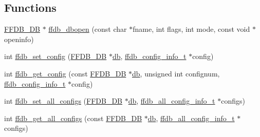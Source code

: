 \subsection*{Functions}
\begin{DoxyCompactItemize}
\item 
\mbox{\hyperlink{adat-devel_2other__libs_2filedb_2filehash_2ffdb__db_8h_a0b27b956926453a7a8141ea8e10f0df8}{F\+F\+D\+B\+\_\+\+DB}} $\ast$ \mbox{\hyperlink{adat-devel_2other__libs_2filedb_2filehash_2ffdb__db_8h_a956b24369a3231de1bee8bc33cae46e0}{ffdb\+\_\+dbopen}} (const char $\ast$fname, int flags, int mode, const void $\ast$openinfo)
\item 
int \mbox{\hyperlink{adat-devel_2other__libs_2filedb_2filehash_2ffdb__db_8h_ae36e14bba7052f0de66a7b5d1308f9ba}{ffdb\+\_\+set\+\_\+config}} (\mbox{\hyperlink{adat-devel_2other__libs_2filedb_2filehash_2ffdb__db_8h_a0b27b956926453a7a8141ea8e10f0df8}{F\+F\+D\+B\+\_\+\+DB}} $\ast$\mbox{\hyperlink{structdb}{db}}, \mbox{\hyperlink{adat-devel_2other__libs_2filedb_2filehash_2ffdb__db_8h_acc961fbd2faf6a849a1620309100fda1}{ffdb\+\_\+config\+\_\+info\+\_\+t}} $\ast$config)
\item 
int \mbox{\hyperlink{adat-devel_2other__libs_2filedb_2filehash_2ffdb__db_8h_a02bc33564d34e6fe08e28f3bad609cfb}{ffdb\+\_\+get\+\_\+config}} (const \mbox{\hyperlink{adat-devel_2other__libs_2filedb_2filehash_2ffdb__db_8h_a0b27b956926453a7a8141ea8e10f0df8}{F\+F\+D\+B\+\_\+\+DB}} $\ast$\mbox{\hyperlink{structdb}{db}}, unsigned int confignum, \mbox{\hyperlink{adat-devel_2other__libs_2filedb_2filehash_2ffdb__db_8h_acc961fbd2faf6a849a1620309100fda1}{ffdb\+\_\+config\+\_\+info\+\_\+t}} $\ast$config)
\item 
int \mbox{\hyperlink{adat-devel_2other__libs_2filedb_2filehash_2ffdb__db_8h_a025a0fd1b0b76b024679498011af4bc3}{ffdb\+\_\+set\+\_\+all\+\_\+configs}} (\mbox{\hyperlink{adat-devel_2other__libs_2filedb_2filehash_2ffdb__db_8h_a0b27b956926453a7a8141ea8e10f0df8}{F\+F\+D\+B\+\_\+\+DB}} $\ast$\mbox{\hyperlink{structdb}{db}}, \mbox{\hyperlink{adat-devel_2other__libs_2filedb_2filehash_2ffdb__db_8h_afc17234e7cd387e11de55b92df6bb0e5}{ffdb\+\_\+all\+\_\+config\+\_\+info\+\_\+t}} $\ast$configs)
\item 
int \mbox{\hyperlink{adat-devel_2other__libs_2filedb_2filehash_2ffdb__db_8h_a4c5be24458701f3a88770dc202be8a0c}{ffdb\+\_\+get\+\_\+all\+\_\+configs}} (const \mbox{\hyperlink{adat-devel_2other__libs_2filedb_2filehash_2ffdb__db_8h_a0b27b956926453a7a8141ea8e10f0df8}{F\+F\+D\+B\+\_\+\+DB}} $\ast$\mbox{\hyperlink{structdb}{db}}, \mbox{\hyperlink{adat-devel_2other__libs_2filedb_2filehash_2ffdb__db_8h_afc17234e7cd387e11de55b92df6bb0e5}{ffdb\+\_\+all\+\_\+config\+\_\+info\+\_\+t}} $\ast$configs)

\end{DoxyCompactItemize}
